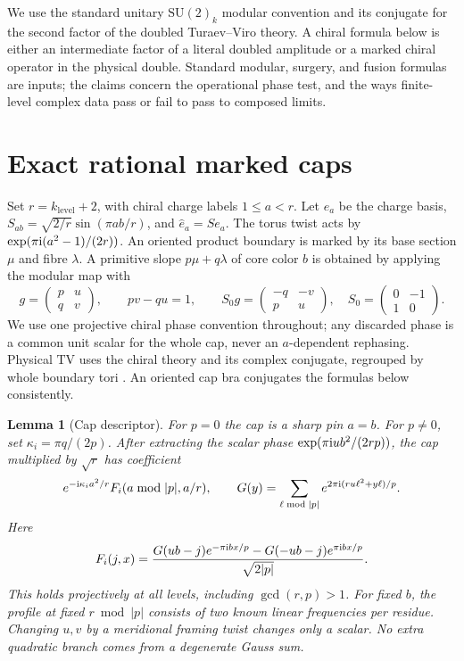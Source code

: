 \documentclass[11pt]{article}
\newtheorem{lemma}[theorem]{Lemma}
\newcommand\ii{{\rm i}}
\newcommand\TV{\mathrm{TV}}
\begin{document}
We use the standard unitary \(\mathrm{SU}(2)_k\) modular convention and its conjugate for the second factor of the doubled Turaev--Viro theory. A chiral formula below is either an intermediate factor of a literal doubled amplitude or a marked chiral operator in the physical double. Standard modular, surgery, and fusion formulas are inputs; the claims concern the operational phase test, and the ways finite-level complex data pass or fail to pass to composed limits.




\section{Exact rational marked caps}

Set \(r=k_{\mathrm{level}}+2\), with chiral charge labels \(1\le a<r\). Let \(e_a\) be the charge basis, \(S_{ab}=\sqrt{2/r}\sin(\pi ab/r)\), and \(\hat e_a=Se_a\). The torus twist acts by \(\exp(\pi\ii(a^2-1)/(2r))\). An oriented product boundary is marked by its base section \(\mu\) and fibre \(\lambda\). A primitive slope \(p\mu+q\lambda\) of core color \(b\) is obtained by applying the modular map with
\[
 g=\begin{pmatrix}p&u\\q&v\end{pmatrix},\qquad pv-qu=1,
 \qquad S_0g=\begin{pmatrix}-q&-v\\p&u\end{pmatrix},
 \quad S_0=\begin{pmatrix}0&-1\\1&0\end{pmatrix}.
\]
We use one projective chiral phase convention throughout; any discarded phase is a common unit scalar for the whole cap, never an \(a\)-dependent rephasing. Physical \(\TV\) uses the chiral theory and its complex conjugate, regrouped by whole boundary tori \cite{Balsam}. An oriented cap bra conjugates the formulas below consistently.

\begin{lemma}[Cap descriptor]\label{lem:cap}
For \(p=0\) the cap is a sharp pin \(a=b\). For \(p\ne0\), set \(\kappa_i=\pi q/(2p)\). After extracting the scalar phase \(\exp(\pi\ii u b^2/(2rp))\), the cap multiplied by \(\sqrt r\) has coefficient
\begin{equation}\label{eq:desc}
 e^{-\ii\kappa_i a^2/r}F_i(a\bmod |p|,a/r),\qquad
 G(y)=\sum_{\ell\bmod |p|} e^{2\pi\ii(r u\ell^2+y\ell)/p}.
\end{equation}
Here
\begin{equation*}
F_i(j,x)=\frac{G(ub-j)e^{-\pi\ii b x/p}-G(-ub-j)e^{\pi\ii b x/p}}
                    {\sqrt{2|p|}}.
\end{equation*}
This holds projectively at all levels, including \(\gcd(r,p)>1\). For fixed \(b\), the profile at fixed \(r\bmod |p|\) consists of two known linear frequencies per residue. Changing \(u,v\) by a meridional framing twist changes only a scalar. No extra quadratic branch comes from a degenerate Gauss sum.
\end{lemma}
\end{document}
